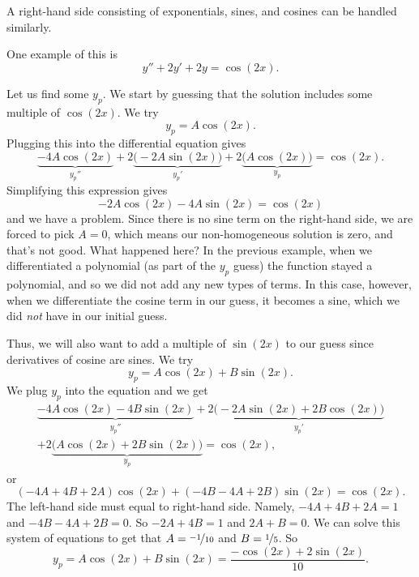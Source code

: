 \medskip

A right-hand side consisting of exponentials, sines, and cosines
can be handled similarly.  
\begin{example} One example of this is 
\begin{equation*}
y''+2y'+2y = \cos (2x) .
\end{equation*}
\end{example}
\begin{exampleSol}
Let us find some $y_p$.  We start by guessing that the solution
includes some multiple of $\cos(2x)$. We try
\begin{equation*}
y_p = A \cos(2x) .
\end{equation*}
Plugging this into the differential equation gives
\begin{equation*}
\underbrace{-4 A \cos (2x)}_{y_p''}
+2 \underbrace{\bigl(-2A \sin (2x)\bigr)}_{y_p'}
+
2 \underbrace{\bigl(A \cos (2x)\bigr)}_{y_p}
= \cos (2x).
\end{equation*}
Simplifying this expression gives
\begin{equation*}
-2A\cos(2x) - 4A\sin(2x) = \cos(2x)
\end{equation*}
and we have a problem. Since there is no sine term on the right-hand side, we are forced to pick $A = 0$, which means our non-homogeneous solution is zero, and that's not good. What happened here? In the previous example, when we differentiated a polynomial (as part of the $y_p$ guess) the function stayed a polynomial, and so we did not add any new types of terms. In this case, however, when we differentiate the cosine term in our guess, it becomes a sine, which we did \emph{not} have in our initial guess. 

Thus, we will also want to add a multiple of $\sin (2x)$ to our guess since derivatives of cosine are
sines.  We try
\begin{equation*}
y_p = A \cos (2x) + B \sin (2x) .
\end{equation*}
We plug $y_p$ into the equation and we get
\begin{multline*}
\underbrace{-4 A \cos (2x) - 4 B \sin (2x)}_{y_p''}
+2 \underbrace{\bigl(-2A \sin (2x) + 2B \cos (2x)\bigr)}_{y_p'}
\\
+
2 \underbrace{\bigl(A \cos (2x) + 2B \sin (2x)\bigr)}_{y_p}
= \cos (2x) ,
\end{multline*}
or
\begin{equation*}
(-4A+4B+2A) \cos(2x) +
(-4B-4A+2B) \sin(2x)
= \cos(2x) .
\end{equation*}
The left-hand side must equal to right-hand side.  Namely,
$-4A + 4B + 2A = 1$ and
$-4B - 4A + 2B = 0$.  So $-2A+4B =1$ and $2A+B=0$. We can solve this system of equations to get that $A=\nicefrac{-1}{10}$ and $B=\nicefrac{1}{5}$.  So
\begin{equation*}
y_p = A \cos (2x) + B \sin (2x) = \frac{-\cos (2x) + 2 \sin (2x)}{10} .
\end{equation*}
\end{exampleSol}

